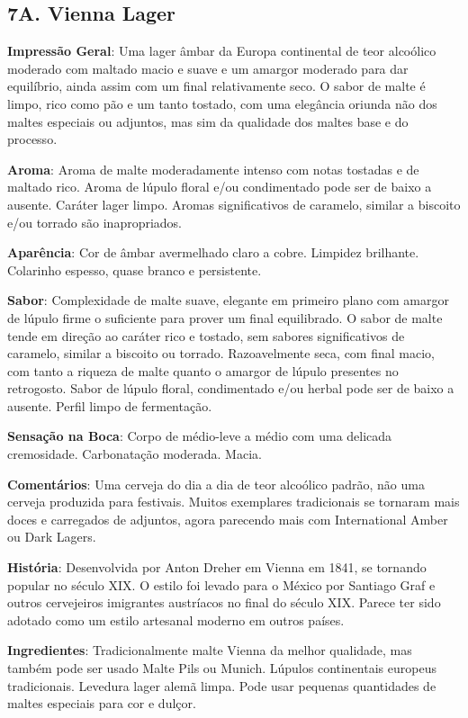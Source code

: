 \subsection*{7A. Vienna Lager}
\textbf{Impressão Geral}: Uma lager âmbar da Europa continental de teor alcoólico moderado com maltado macio e suave e um amargor moderado para dar equilíbrio, ainda assim com um final relativamente seco. O sabor de malte é limpo, rico como pão e um tanto tostado, com uma elegância oriunda não dos maltes especiais ou adjuntos, mas sim da qualidade dos maltes base e do processo.

\textbf{Aroma}: Aroma de malte moderadamente intenso com notas tostadas e de maltado rico. Aroma de lúpulo floral e/ou condimentado  pode ser de baixo a ausente. Caráter lager limpo. Aromas significativos de caramelo, similar a biscoito e/ou torrado são inapropriados.

\textbf{Aparência}: Cor de âmbar avermelhado claro a cobre. Limpidez brilhante. Colarinho espesso, quase branco e persistente.

\textbf{Sabor}: Complexidade de malte suave, elegante em primeiro plano com amargor de lúpulo firme o suficiente para prover um final equilibrado. O sabor de malte tende em direção ao caráter rico e tostado, sem sabores significativos de caramelo, similar a biscoito ou torrado. Razoavelmente seca, com final macio, com tanto a riqueza de malte quanto o amargor de lúpulo presentes no retrogosto. Sabor de lúpulo floral, condimentado e/ou herbal pode ser de baixo a ausente. Perfil limpo de fermentação.

\textbf{Sensação na Boca}: Corpo de médio-leve a médio com uma delicada cremosidade. Carbonatação moderada. Macia.

\textbf{Comentários}: Uma cerveja do dia a dia de teor alcoólico padrão, não uma cerveja produzida para festivais. Muitos exemplares tradicionais se tornaram mais doces e carregados de adjuntos, agora parecendo mais com International Amber ou Dark Lagers.

\textbf{História}: Desenvolvida por Anton Dreher em Vienna em 1841, se tornando popular no século XIX. O estilo foi levado para o México por Santiago Graf e outros cervejeiros imigrantes austríacos no final do século XIX. Parece ter sido adotado como um estilo artesanal moderno em outros países.

\textbf{Ingredientes}: Tradicionalmente malte Vienna da melhor qualidade, mas também pode ser usado Malte Pils ou Munich. Lúpulos continentais europeus tradicionais. Levedura lager alemã limpa. Pode usar pequenas quantidades de maltes especiais para cor e dulçor.

